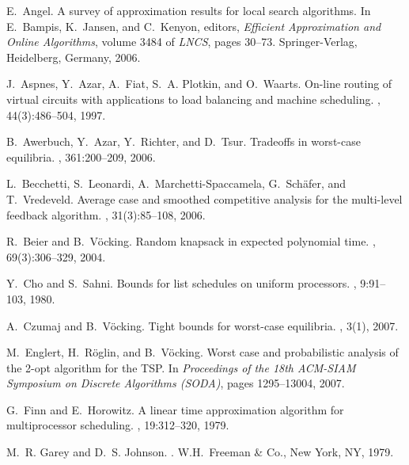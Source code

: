 \documentclass[a4paper,11pt,fleqn]{article}
\begin{document}
\begin{thebibliography}{10}

E.~Angel.
\newblock A survey of approximation results for local search algorithms.
\newblock In E.~Bampis, K.~Jansen, and C.~Kenyon, editors, {\em Efficient
  Approximation and Online Algorithms}, volume 3484 of {\em LNCS}, pages
  30--73. Springer-Verlag, Heidelberg, Germany, 2006.

J.~Aspnes, Y.~Azar, A.~Fiat, S.~A. Plotkin, and O.~Waarts.
\newblock On-line routing of virtual circuits with applications to load
  balancing and machine scheduling.
, 44(3):486--504, 1997.

B.~Awerbuch, Y.~Azar, Y.~Richter, and D.~Tsur.
\newblock Tradeoffs in worst-case equilibria.
, 361:200--209, 2006.

L.~Becchetti, S.~Leonardi, A.~Marchetti-Spaccamela, G.~Sch{\"a}fer, and
  T.~Vredeveld.
\newblock Average case and smoothed competitive analysis for the multi-level
  feedback algorithm.
, 31(3):85--108, 2006.

R.~Beier and B.~V{\"o}cking.
\newblock Random knapsack in expected polynomial time.
, 69(3):306--329, 2004.

Y.~Cho and S.~Sahni.
\newblock Bounds for list schedules on uniform processors.
, 9:91--103, 1980.

A.~Czumaj and B.~V\"ocking.
\newblock Tight bounds for worst-case equilibria.
, 3(1), 2007.

M.~Englert, H.~R\"oglin, and B.~V\"ocking.
\newblock Worst case and probabilistic analysis of the 2-opt algorithm for the
  {TSP}.
\newblock In {\em Proceedings of the 18th {ACM-SIAM} Symposium on Discrete
  Algorithms ({SODA})}, pages 1295--13004, 2007.

G.~Finn and E.~Horowitz.
\newblock A linear time approximation algorithm for multiprocessor scheduling.
, 19:312--320, 1979.

M.~R. Garey and D.~S. Johnson.
.
\newblock W.H.~Freeman \& Co., New York, NY, 1979.


\end{thebibliography}
\end{document}
